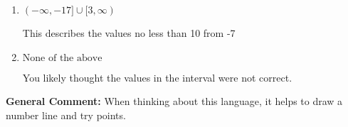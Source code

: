 \documentclass{extbook}[14pt]
\begin{document}
\begin{enumerate}
{\begin{enumerate}[label=\Alph*.]
This describes the values more than 10 from -7
\item \( (-\infty, -17] \cup [3, \infty) \)

This describes the values no less than 10 from -7
\item \( \text{None of the above} \)

You likely thought the values in the interval were not correct.
\end{enumerate}

\textbf{General Comment:} When thinking about this language, it helps to draw a number line and try points.
}
\end{enumerate}
\end{document}

